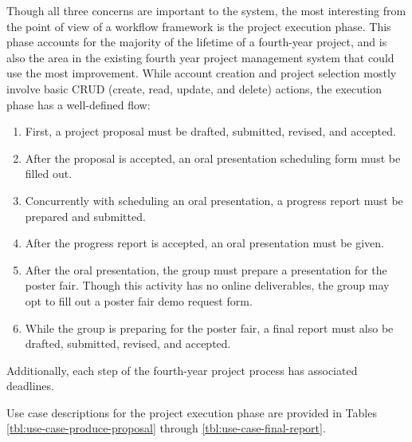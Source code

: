 Though all three concerns are important to the system, the most interesting from the point of view of a workflow framework is the project execution phase. This phase accounts for the majority of the lifetime of a fourth-year project, and is also the area in the existing fourth year project management system that could use the most improvement. While account creation and project selection mostly involve basic CRUD (create, read, update, and delete) actions, the execution phase has a well-defined flow:
\begin{enumerate}
\item First, a project proposal must be drafted, submitted, revised, and accepted.
\item After the proposal is accepted, an oral presentation scheduling form must be filled out.
\item Concurrently with scheduling an oral presentation, a progress report must be prepared and submitted.
\item After the progress report is accepted, an oral presentation must be given.
\item After the oral presentation, the group must prepare a presentation for the poster fair. Though this activity has no online deliverables, the group may opt to fill out a poster fair demo request form.
\item While the group is preparing for the poster fair, a final report must also be drafted, submitted, revised, and accepted.
\end{enumerate}
Additionally, each step of the fourth-year project process has associated deadlines.

Use case descriptions for the project execution phase are provided in Tables \ref{tbl:use-case-produce-proposal} through \ref{tbl:use-case-final-report}.

